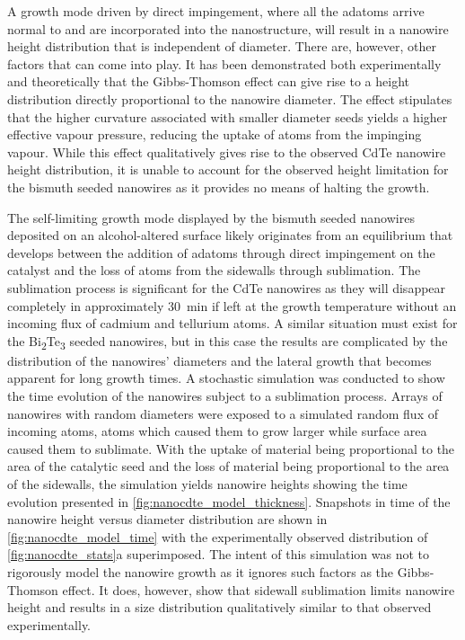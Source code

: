 A growth mode driven by direct impingement, where all the adatoms arrive normal to and are incorporated into the nanostructure, will result in a nanowire height distribution that is independent of diameter.
There are, however, other factors that can come into play.
It has been demonstrated both experimentally\cite{Schubert2004a,Wu2002} and theoretically\cite{Kashchiev2006,Chen2006} that the Gibbs-Thomson effect can give rise to a height distribution directly proportional to the nanowire diameter.
The effect stipulates that the higher curvature associated with smaller diameter seeds yields a higher effective vapour pressure, reducing the uptake of atoms from the impinging vapour.
While this effect qualitatively gives rise to the observed CdTe nanowire height distribution, it is unable to account for the observed height limitation for the bismuth seeded nanowires as it provides no means of halting the growth.

The self-limiting growth mode displayed by the bismuth seeded nanowires deposited on an alcohol-altered surface likely originates from an equilibrium that develops between the addition of adatoms through direct impingement on the catalyst and the loss of atoms from the sidewalls through sublimation.
The sublimation process is significant for the CdTe nanowires as they will disappear completely in approximately 30~min if left at the growth temperature without an incoming flux of cadmium and tellurium atoms.
A similar situation must exist for the Bi\textsubscript{2}Te\textsubscript{3} seeded nanowires, but in this case the results are complicated by the distribution of the nanowires' diameters and the lateral growth that becomes apparent for long growth times.
A stochastic simulation was conducted to show the time evolution of the nanowires subject to a sublimation process.
Arrays of nanowires with random diameters were exposed to a simulated random flux of incoming atoms, atoms which caused them to grow larger while surface area caused them to sublimate.
With the uptake of material being proportional to the area of the catalytic seed and the loss of material being proportional to the area of the sidewalls, the simulation yields nanowire heights showing the time evolution presented in \cref{fig:nanocdte_model_thickness}.
Snapshots in time of the nanowire height versus diameter distribution are shown in \cref{fig:nanocdte_model_time} with the experimentally observed distribution of \cref{fig:nanocdte_stats}a superimposed.
The intent of this simulation was not to rigorously model the nanowire growth as it ignores such factors as the Gibbs-Thomson effect.
It does, however, show that sidewall sublimation limits nanowire height and results in a size distribution qualitatively similar to that observed experimentally.

